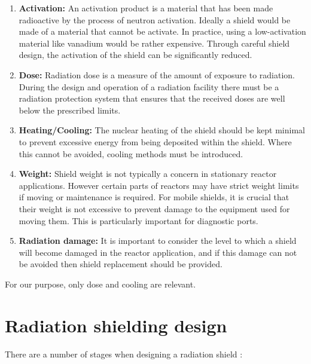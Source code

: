 \begin{enumerate}
      \item \textbf{Activation:}
            An activation product is a material that has been made radioactive by the process of neutron activation.
            Ideally a shield would be made of a material that cannot be activate.
            In practice, using a low-activation material like vanadium would be rather expensive.
            Through careful shield design, the activation of the shield can be significantly reduced.

      \item \textbf{Dose:}
            Radiation dose is a measure of the amount of exposure to radiation.
            During the design and operation of a radiation facility there must be a radiation protection system that ensures that the received doses are well below the prescribed limits.

      \item \textbf{Heating/Cooling:}
            The nuclear heating of the shield should be kept minimal to prevent excessive energy from being deposited within the shield.
            Where this cannot be avoided, cooling methods must be introduced.

      \item \textbf{Weight:}
            Shield weight is not typically a concern in stationary reactor applications.
            However certain parts of reactors may have strict weight limits if moving or maintenance is required.
            For mobile shields, it is crucial that their weight is not excessive to prevent damage to the equipment used for moving them.
            This is particularly important for diagnostic ports.

      \item \textbf{Radiation damage:}
            It is important to consider the level to which a shield will become damaged in the reactor application, and if this damage can not be avoided then shield replacement should be provided.

\end{enumerate}

For our purpose, only dose and cooling are relevant.


\section{Radiation shielding design}
There are a number of stages when designing a radiation shield \cite{RadShi}:

